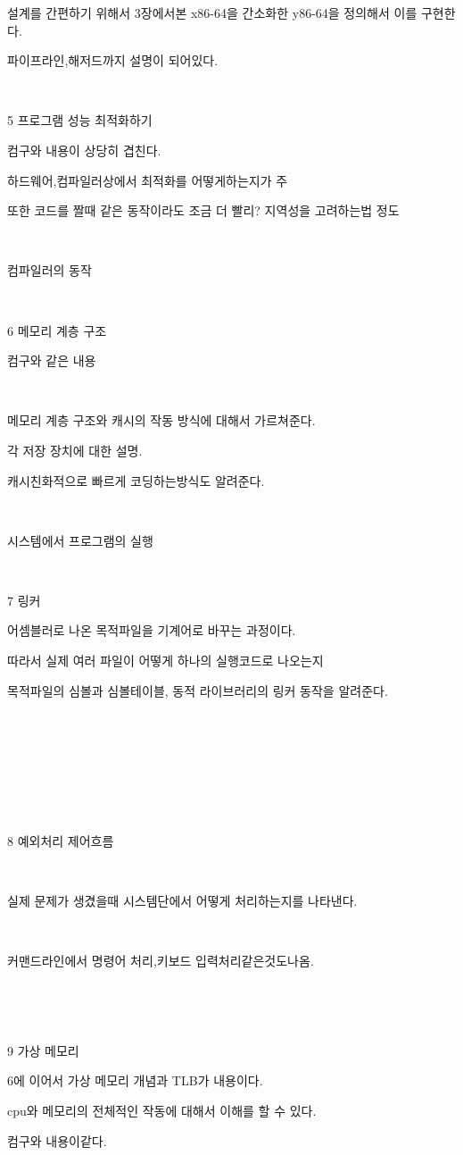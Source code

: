 설계를 간편하기 위해서 3장에서본 x86-64을 간소화한 y86-64을 정의해서 이를 구현한다.

파이프라인,해저드까지 설명이 되어있다.

​

5 프로그램 성능 최적화하기

컴구와 내용이 상당히 겹친다.

하드웨어,컴파일러상에서 최적화를 어떻게하는지가 주

또한 코드를 짤때 같은 동작이라도 조금 더 빨리? 지역성을 고려하는법 정도

​

컴파일러의 동작

​

6 메모리 계층 구조

컴구와 같은 내용

​

메모리 계층 구조와 캐시의 작동 방식에 대해서 가르쳐준다.

각 저장 장치에 대한 설명.

캐시친화적으로 빠르게 코딩하는방식도 알려준다.

​

시스템에서 프로그램의 실행

​

7 링커

어셈블러로 나온 목적파일을 기계어로 바꾸는 과정이다.

따라서 실제 여러 파일이 어떻게 하나의 실행코드로 나오는지 

목적파일의 심볼과 심볼테이블, 동적 라이브러리의 링커 동작을 알려준다.

​

​

​

​

8 예외처리 제어흐름

​

실제 문제가 생겼을때 시스템단에서 어떻게 처리하는지를 나타낸다.

​

커맨드라인에서 명령어 처리,키보드 입력처리같은것도나옴.

​

​

9 가상 메모리

6에 이어서 가상 메모리 개념과 TLB가 내용이다. 

cpu와 메모리의 전체적인 작동에 대해서 이해를 할 수 있다.

컴구와 내용이같다.

​

